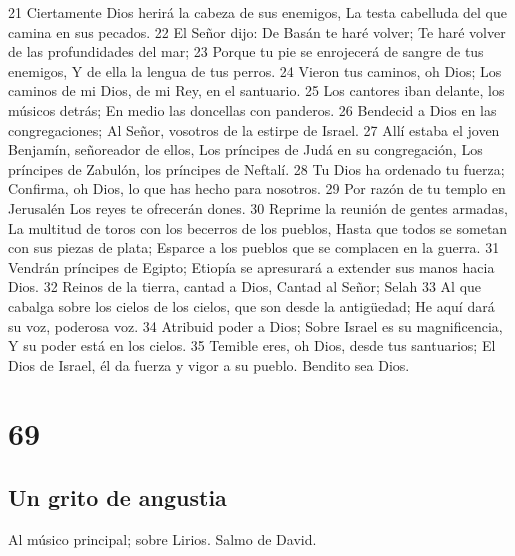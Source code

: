 21 Ciertamente Dios herirá la cabeza de sus enemigos,
La testa cabelluda del que camina en sus pecados.
22 El Señor dijo: De Basán te haré volver;
Te haré volver de las profundidades del mar;
23 Porque tu pie se enrojecerá de sangre de tus enemigos,
Y de ella la lengua de tus perros.
24 Vieron tus caminos, oh Dios;
Los caminos de mi Dios, de mi Rey, en el santuario.
25 Los cantores iban delante, los músicos detrás;
En medio las doncellas con panderos.
26 Bendecid a Dios en las congregaciones;
Al Señor, vosotros de la estirpe de Israel.
27 Allí estaba el joven Benjamín, señoreador de ellos,
Los príncipes de Judá en su congregación,
Los príncipes de Zabulón, los príncipes de Neftalí.
28 Tu Dios ha ordenado tu fuerza;
Confirma, oh Dios, lo que has hecho para nosotros.
29 Por razón de tu templo en Jerusalén
Los reyes te ofrecerán dones.
30 Reprime la reunión de gentes armadas,
La multitud de toros con los becerros de los pueblos,
Hasta que todos se sometan con sus piezas de plata;
Esparce a los pueblos que se complacen en la guerra.
31 Vendrán príncipes de Egipto;
Etiopía se apresurará a extender sus manos hacia Dios.
32 Reinos de la tierra, cantad a Dios,
Cantad al Señor; Selah
33 Al que cabalga sobre los cielos de los cielos, que son desde la antigüedad;
He aquí dará su voz, poderosa voz.
34 Atribuid poder a Dios;
Sobre Israel es su magnificencia,
Y su poder está en los cielos.
35 Temible eres, oh Dios, desde tus santuarios;
El Dios de Israel, él da fuerza y vigor a su pueblo.
Bendito sea Dios.

\chapter{69}

\section*{Un grito de angustia}

Al músico principal; sobre Lirios. Salmo de David.

